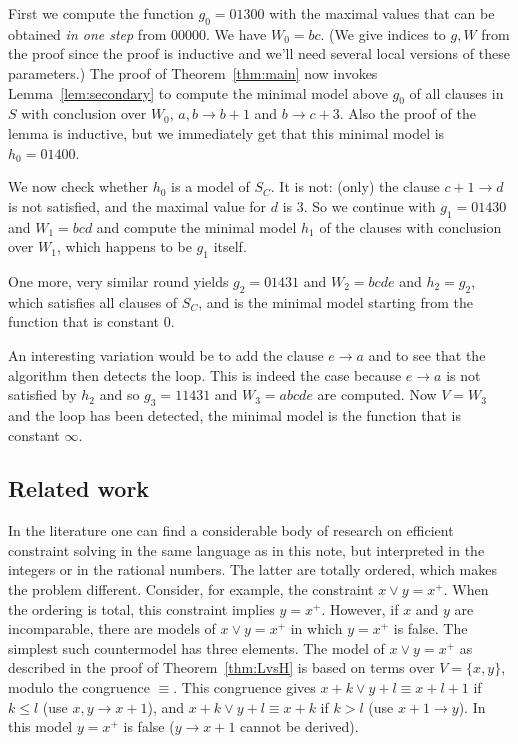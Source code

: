 \documentclass[11pt,a4paper]{article}
\newcommand\set[1]{\{#1\}}
\begin{document}
First we compute the function $g_0 = 01300$ with the maximal values
that can be obtained \emph{in one step} from $00000$. We have $W_0 = bc$.
(We give indices to $g,W$ from the proof since the proof is inductive 
and we'll need several local versions of these parameters.) 
The proof of Theorem~\ref{thm:main} now invokes
Lemma~\ref{lem:secondary} to compute the minimal model 
above $g_0$ of all clauses in $S$ with conclusion over $W_0$,
$a,b\to b+1$ and $b\to c+3$. Also the proof of the lemma is inductive,
but we immediately get that this minimal model is $h_0 = 01400$.

We now check whether $h_0$ is a model of $S_C$. It is not:
(only) the clause $c+1\to d$ is not satisfied, and the
maximal value for $d$ is $3$. So we continue with
$g_1 = 01430$ and $W_1 = bcd$ and compute the minimal
model $h_1$ of the clauses with conclusion over $W_1$,
which happens to be $g_1$ itself.

One more, very similar round yields
$g_2 = 01431$ and $W_2 = bcde$ and $h_2=g_2$,
which satisfies all clauses of $S_C$, and is the minimal 
model starting from the function that is constant $0$.

An interesting variation would be to add the clause
$e\to a$ and to see that the algorithm then detects
the loop. This is indeed the
case because $e\to a$ is not satisfied by $h_2$ and so
$g_3 = 11431$ and $W_3=abcde$ are computed.
Now $V=W_3$ and the loop has been detected,
the minimal model is the function that is constant $\infty$.


\subsection{Related work}


In the literature one can find a considerable body of research 
on efficient constraint solving in the same language as in this note,
but interpreted in the integers or in the rational numbers.
The latter are totally ordered, which makes the problem different.
Consider, for example, the constraint $x\vee y = x^+$.
When the ordering is total, this constraint implies $y = x^+$.
However, if $x$ and $y$ are incomparable, there are models
of $x\vee y = x^+$ in which $y = x^+$ is false. The simplest
such countermodel has three elements. The model of $x\vee y = x^+$
as described in the proof of Theorem~\ref{thm:LvsH} is based
on terms over $V=\set{x,y}$, modulo the congruence $\equiv$.
This congruence gives ${x+k \vee y+l} \equiv {x+l+1}$ if $k\leq l$
(use $x,y \to x+1$),
and ${x+k \vee y+l} \equiv {x+k}$ if $k>l$
(use $x+1\to y$).
In this model $y = x^+$ is false ($y\to x+1$ cannot be derived).
\end{document}
